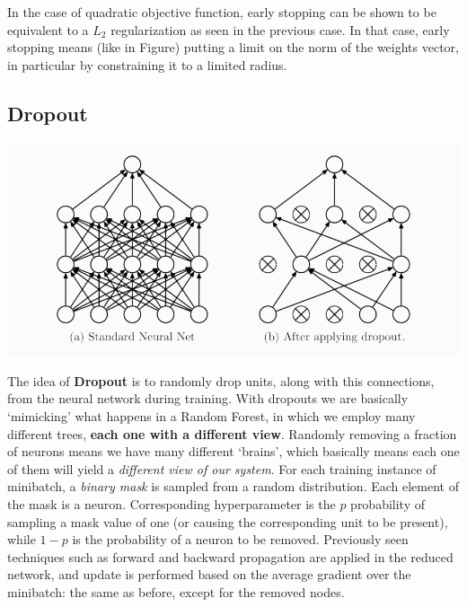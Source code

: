 \documentclass[10pt]{report}
\begin{document}
In the case of quadratic objective function, early stopping can be shown
to be equivalent to a \(L_2\) regularization as seen in the previous
case. In that case, early stopping means (like in Figure) putting a
limit on the norm of the weights vector, in particular by constraining
it to a limited radius.

\subsection{Dropout}
\label{dropout}
\begin{center}
\includegraphics[width=.9\linewidth]{./pics/cnn/dropout1.jpg}
\end{center}

The idea of \textbf{Dropout} is to randomly drop units, along with this
connections, from the neural network during training. With dropouts we
are basically `mimicking' what happens in a Random Forest, in which we
employ many different trees, \textbf{each one with a different view}. Randomly
removing a fraction of neurons means we have many different `brains',
which basically means each one of them will yield a \emph{different view of
our system}. For each training instance of minibatch, a \emph{binary mask} is
sampled from a random distribution. Each element of the mask is a
neuron. Corresponding hyperparameter is the \(p\) probability of
sampling a mask value of one (or causing the corresponding unit to be
present), while \(1-p\) is the probability of a neuron to be removed.
Previously seen techniques such as forward and backward propagation are
applied in the reduced network, and update is performed based on the
average gradient over the minibatch: the same as before, except for the removed nodes.
\end{document}
